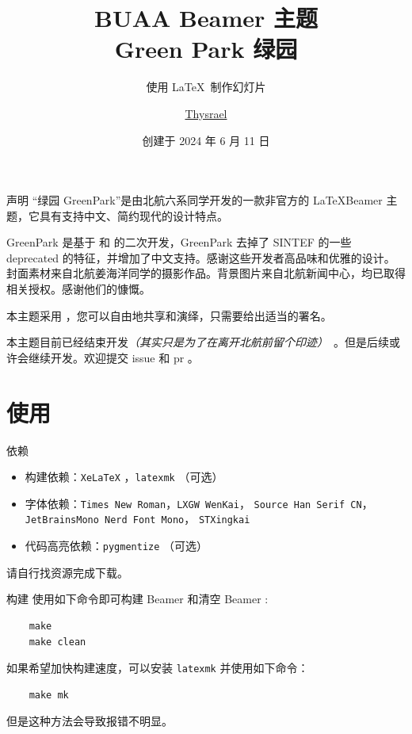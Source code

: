 \documentclass{ctexbeamer}
\title{BUAA Beamer 主题 \\ Green Park 绿园}
\subtitle{使用 \LaTeX\ 制作幻灯片}
\author{\href{https://github.com/Thysrael}{Thysrael}}
\date{创建于 2024 年 6 月 11 日}
\begin{document}
\maketitle

\begin{frame}{声明}
  “绿园 GreenPark”是由北航六系同学开发的一款非官方的 \LaTeX Beamer 主题，它具有支持中文、简约现代的设计特点。
  
  GreenPark 是基于  和  的二次开发，GreenPark 去掉了 SINTEF 的一些 deprecated 的特征，并增加了中文支持。感谢这些开发者高品味和优雅的设计。封面素材来自北航姜海洋同学的摄影作品。背景图片来自北航新闻中心，均已取得相关授权。感谢他们的慷慨。

  本主题采用 ，您可以自由地共享和演绎，只需要给出适当的署名。

  本主题目前已经结束开发\textsl{（其实只是为了在离开北航前留个印迹）}\   。但是后续或许会继续开发。欢迎提交 issue 和 pr 。

\end{frame}

\section{使用}
\begin{frame}{依赖}
  \begin{itemize}
  \item 构建依赖：\texttt{XeLaTeX} ，\texttt{latexmk} （可选）
  \item 字体依赖：\texttt{Times New Roman}，\texttt{LXGW WenKai}， \texttt{Source Han Serif CN}，\texttt{JetBrainsMono Nerd Font Mono}， \texttt{STXingkai}
  \item 代码高亮依赖：\texttt{pygmentize} （可选）
  \end{itemize}

  请自行找资源完成下载。
\end{frame}

\begin{frame}[fragile]{构建}
  使用如下命令即可构建 Beamer 和清空 Beamer :
  
  \begin{verbatim}
    make
    make clean
  \end{verbatim}

  如果希望加快构建速度，可以安装 \texttt{latexmk} 并使用如下命令：

  \begin{verbatim}
    make mk
  \end{verbatim}

  但是这种方法会导致报错不明显。
\end{frame}
\end{document}

